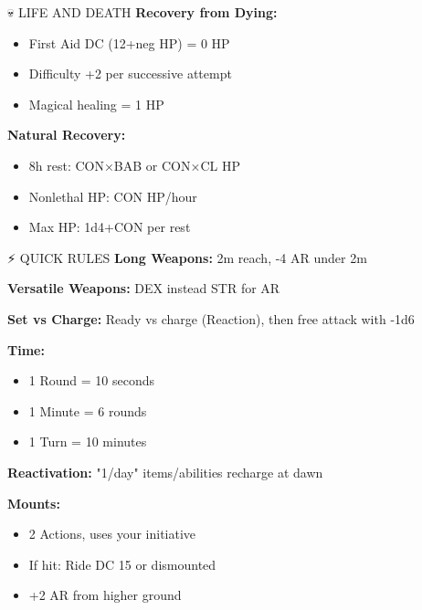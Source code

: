 \documentclass[10pt,a4paper,landscape]{article}
\begin{document}
\begin{multicols}{4}
\begin{mainsection}{💀 LIFE AND DEATH}
			\textbf{Recovery from Dying:}
			\begin{itemize}[noitemsep,leftmargin=8pt]
				\item First Aid DC (12+neg HP) = 0 HP
				\item Difficulty +2 per successive attempt
				\item Magical healing = 1 HP
			\end{itemize}
			
			\textbf{Natural Recovery:}
			\begin{itemize}[noitemsep,leftmargin=8pt]
				\item 8h rest: CON×BAB or CON×CL HP
				\item Nonlethal HP: CON HP/hour
				\item Max HP: 1d4+CON per rest
			\end{itemize}
		\end{mainsection}
		
		\begin{mainsection}{⚡ QUICK RULES}
			\textbf{Long Weapons:} 2m reach, -4 AR under 2m
			
			\textbf{Versatile Weapons:} DEX instead STR for AR
			
			\textbf{Set vs Charge:} Ready vs charge (Reaction), then free attack with -1d6
			
			\medskip
			
			\textbf{Time:}
			\begin{itemize}[noitemsep,leftmargin=8pt]
				\item 1 Round = 10 seconds
				\item 1 Minute = 6 rounds
				\item 1 Turn = 10 minutes
			\end{itemize}
			
			\textbf{Reactivation:} "1/day" items/abilities recharge at dawn
			
			\medskip
			
			\textbf{Mounts:}
			\begin{itemize}[noitemsep,leftmargin=8pt]
				\item 2 Actions, uses your initiative
				\item If hit: Ride DC 15 or dismounted
				\item +2 AR from higher ground
			\end{itemize}
		\end{mainsection}
		
	\end{multicols}
	
\end{document}
